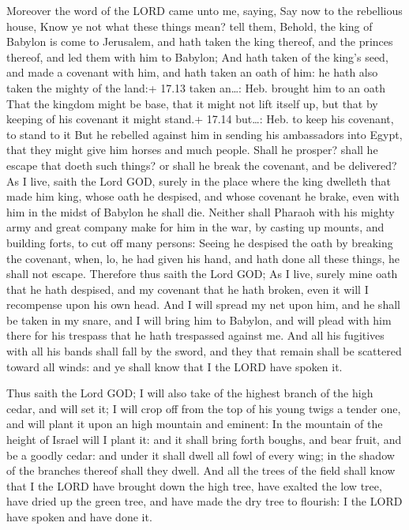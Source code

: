  Moreover the word of the LORD came unto me, saying,
 Say now to the rebellious house, Know ye not what these
things mean? tell them, Behold, the king of Babylon is come to
Jerusalem, and hath taken the king thereof, and the princes thereof, and
led them with him to Babylon;  And hath taken of the king's
seed, and made a covenant with him, and hath taken an oath of him: he
hath also taken the mighty of the land:+ 17.13 taken an\ldots: Heb.
brought him to an oath  That the kingdom might be base,
that it might not lift itself up, but that by keeping of his covenant it
might stand.+ 17.14 but\ldots: Heb. to keep his covenant, to stand to it
 But he rebelled against him in sending his ambassadors
into Egypt, that they might give him horses and much people. Shall he
prosper? shall he escape that doeth such things? or shall he break the
covenant, and be delivered?  As I live, saith the Lord GOD,
surely in the place where the king dwelleth that made him king, whose
oath he despised, and whose covenant he brake, even with him in the
midst of Babylon he shall die.  Neither shall Pharaoh with
his mighty army and great company make for him in the war, by casting up
mounts, and building forts, to cut off many persons: 
Seeing he despised the oath by breaking the covenant, when, lo, he had
given his hand, and hath done all these things, he shall not escape.
 Therefore thus saith the Lord GOD; As I live, surely mine
oath that he hath despised, and my covenant that he hath broken, even it
will I recompense upon his own head.  And I will spread my
net upon him, and he shall be taken in my snare, and I will bring him to
Babylon, and will plead with him there for his trespass that he hath
trespassed against me.  And all his fugitives with all his
bands shall fall by the sword, and they that remain shall be scattered
toward all winds: and ye shall know that I the LORD have spoken it.

 Thus saith the Lord GOD; I will also take of the highest
branch of the high cedar, and will set it; I will crop off from the top
of his young twigs a tender one, and will plant it upon an high mountain
and eminent:  In the mountain of the height of Israel will
I plant it: and it shall bring forth boughs, and bear fruit, and be a
goodly cedar: and under it shall dwell all fowl of every wing; in the
shadow of the branches thereof shall they dwell.  And all
the trees of the field shall know that I the LORD have brought down the
high tree, have exalted the low tree, have dried up the green tree, and
have made the dry tree to flourish: I the LORD have spoken and have done
it.

